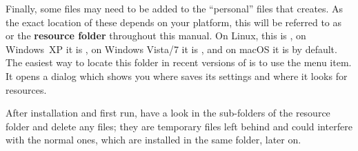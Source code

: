 Finally, some files may need to be added to the ``personal'' files that {\Tw} creates. As the exact location of these depends on your platform, this will be referred to as  or the \textbf{{\Tw} resource folder} throughout this manual. On Linux, this is , on Windows~XP it is , on Windows Vista/7 it is , and on macOS it is  by default. The easiest way to locate this folder in recent versions of {\Tw} is to use the \submenu{} menu item. It opens a dialog which shows you where {\Tw} saves its settings and where it looks for resources.

After installation and first run, have a look in the sub-folders of the {\Tw} resource folder and delete any  files; they are temporary files left behind and could interfere with the normal ones, which are installed in the same folder, later on.
